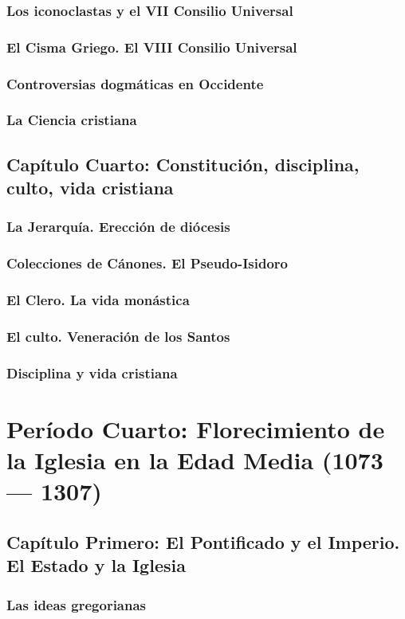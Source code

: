 \raggedbottom{} \documentclass[12pt, a4paper, openany]{book} %
\begin{document}
\section{Los iconoclastas y el VII Consilio Universal}
\section{El Cisma Griego. El VIII Consilio Universal}
\section{Controversias dogmáticas en Occidente}
\section{La Ciencia cristiana}
\chapter{Capítulo Cuarto: Constitución, disciplina, culto, vida cristiana}
\section{La Jerarquía. Erección de diócesis}
\section{Colecciones de Cánones. El Pseudo-Isidoro}
\section{El Clero. La vida monástica}
\section{El culto. Veneración de los Santos}
\section{Disciplina y vida cristiana}
\part{Período Cuarto: Florecimiento de la Iglesia en la Edad Media (1073 --- 1307)}
\chapter{Capítulo Primero: El Pontificado y el Imperio. El Estado y la Iglesia}
\section{Las ideas gregorianas}
\end{document}
